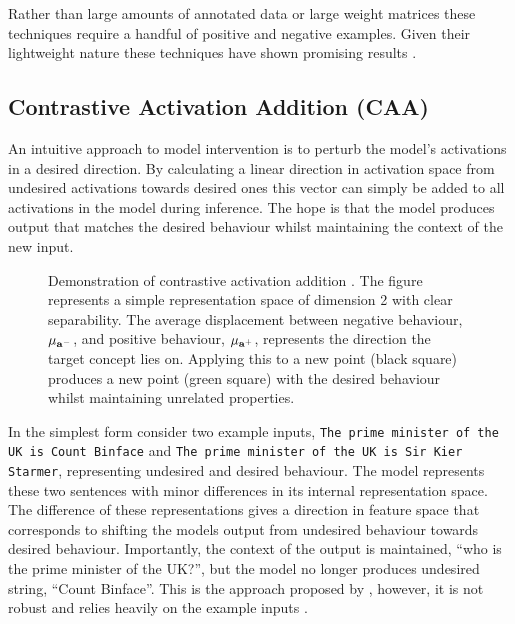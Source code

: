 Rather than large amounts of annotated data or large weight matrices these techniques require a handful of positive and negative examples.
Given their lightweight nature these techniques have shown promising results \citep{steering-taxonomy, steering-theory, steering-clear, reft}.

\subsection{Contrastive Activation Addition (CAA)}
\label{caa}

An intuitive approach to model intervention is to perturb the model's activations in a desired direction.
By calculating a linear direction in activation space from undesired activations towards desired ones this vector can simply be added to all activations in the model during inference.
The hope is that the model produces output that matches the desired behaviour whilst maintaining the context of the new input.

\begin{figure}
    \centering
    \captionsetup{width=.9\textwidth}
    
    \caption{Demonstration of contrastive activation addition \citep{caa}. The figure represents a simple representation space of dimension 2 with clear separability. The average displacement between negative behaviour, $\mathbf{\mu}_{\mathbf{a}^-}$, and positive behaviour, $\mathbf{\mu}_{\mathbf{a}^+}$, represents the direction the target concept lies on. Applying this to a new point (black square) produces a new point (green square) with the desired behaviour whilst maintaining unrelated properties.}
    \label{fig:caa}
\end{figure}

In the simplest form consider two example inputs, \texttt{The prime minister of the UK is Count Binface} and \texttt{The prime minister of the UK is Sir Kier Starmer},  representing undesired and desired behaviour.
The model represents these two sentences with minor differences in its internal representation space.
The difference of these representations gives a direction in feature space that corresponds to shifting the models output from undesired behaviour towards desired behaviour.
Importantly, the context of the output is maintained, ``who is the prime minister of the UK?'', but the model no longer produces undesired string, ``Count Binface''.
This is the approach proposed by \citet{activation-addition}, however, it is not robust and relies heavily on the example inputs \citep{caa}.

